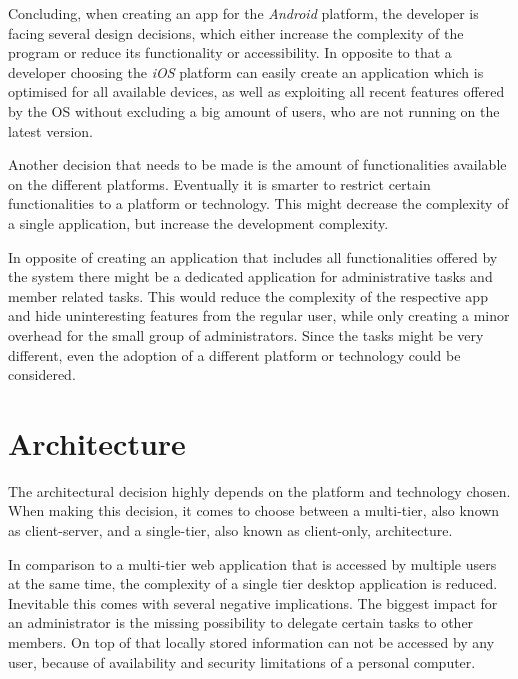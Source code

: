 Concluding, when creating an app for the \emph{Android} platform, the developer is facing several design decisions, which either increase the complexity of the program or reduce its functionality or accessibility. In opposite to that a developer choosing the \emph{iOS} platform can easily create an application which is optimised for all available devices, as well as exploiting all recent features offered by the \acrlong{OS} without excluding a big amount of users, who are not running on the latest version. 

Another decision that needs to be made is the amount of functionalities available on the different platforms. Eventually it is smarter to restrict certain functionalities to a platform or technology. This might decrease the complexity of a single application, but increase the development complexity.

In opposite of creating an application that includes all functionalities offered by the system there might be a dedicated application for administrative tasks and member related tasks. This would reduce the complexity of the respective app and hide uninteresting features from the regular user, while only creating a minor overhead for the small group of administrators. Since the tasks might be very different, even the adoption of a different platform or technology could be considered. 

\section{Architecture} %

The architectural decision highly depends on the platform and technology chosen. When making this decision, it comes to choose between a multi-tier, also known as client-server, and a single-tier, also known as client-only, architecture.

In comparison to a multi-tier web application that is accessed by multiple users at the same time, the complexity of a single tier desktop application is reduced. Inevitable this comes with several negative implications. The biggest impact for an administrator is the missing possibility to delegate certain tasks to other members. On top of that locally stored information can not be accessed by any user, because of availability and security limitations of a personal computer.

